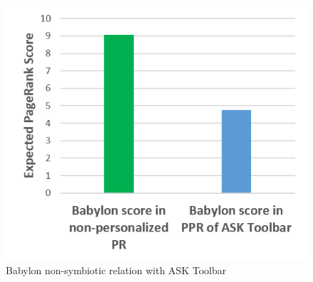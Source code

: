 \documentclass[11pt,oneside]{book}
\begin{document}
\begin{figure}[h]
\centering
\includegraphics[width=\linewidth]{figures/babylon_nosym_ask.png}
\caption{Babylon non-symbiotic relation with ASK Toolbar}
\label{fig:babylon_nosym_ask}
\end{figure}
\fi
\end{document}
